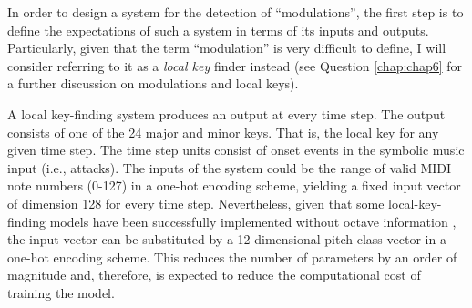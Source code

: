 









In order to design a system for the detection of
``modulations'', the first step is to define the
expectations of such a system in terms of its inputs and
outputs. Particularly, given that the term ``modulation'' is
very difficult to define, I will consider referring to it as
a \emph{local key} finder instead (see Question
\ref{chap:chap6} for a further discussion on modulations and
local keys).

A local key-finding system produces an output at every time
step. The output consists of one of the 24 major and minor
keys. That is, the local key for any given time step. The
time step units consist of onset events in the symbolic
music input (i.e., attacks). The inputs of the system could
be the range of valid MIDI note numbers (0-127) in a one-hot
encoding scheme, yielding a fixed input vector of dimension
128 for every time step. Nevertheless, given that some
local-key-finding models have been successfully implemented
without octave information
\cite{napoleslopez2019keyfinding}, the input vector can be
substituted by a 12-dimensional pitch-class vector in a
one-hot encoding scheme. This reduces the number of
parameters by an order of magnitude and, therefore, is
expected to reduce the computational cost of training the
model.

